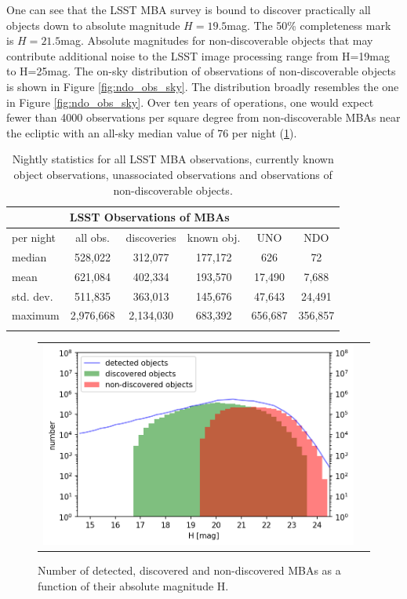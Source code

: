 One can see that the LSST MBA survey is bound to discover practically all objects down to absolute magnitude $H=19.5$mag. The 50\% completeness mark is $H=21.5$mag.
Absolute magnitudes for non-discoverable objects that may contribute additional noise to the LSST image processing range from H=19mag to H=25mag.
The on-sky distribution of observations of non-discoverable objects is shown in Figure \ref{fig:ndo_obs_sky}. The distribution broadly resembles the one in Figure \ref{fig:ndo_obs_sky}. Over ten years of operations, one would expect fewer than 4000 observations per square degree from non-discoverable MBAs near the ecliptic with an all-sky median value of 76 per night (\ref{tab:obs_stats}).   
%
\begin{table}[tb!]
\begin{center}
\begin{tabular}{lccccc}
\multicolumn{5}{c}{LSST Observations of MBAs}\\
\hline\hline
per night & all obs. & discoveries & known obj. & UNO & NDO \\\hline
median  & 528,022 &312,077  &177,172 &626 &72 \\
mean & 621,084 & 402,334 & 193,570 & 17,490 & 7,688 \\
std. dev. & 511,835 & 363,013& 145,676 &47,643 & 24,491\\
maximum & 2,976,668 & 2,134,030 & 683,392 & 656,687 & 356,857\\
\hline\hline\\
\end{tabular}
\end{center}
\caption{Nightly statistics for all LSST MBA observations, currently known object observations, unassociated observations and observations of
non-discoverable objects.}
\label{tab:obs_stats}
\end{table}
%

\begin{figure}[tb!]
\begin{center}
\begin{tabular}{cc}
\includegraphics[width=0.70\linewidth]{figs/detection_discovered2.png}
\end{tabular}
\end{center}
\caption{Number of detected, discovered and non-discovered MBAs as a function of their absolute magnitude H. }
\label{fig:ndo_h}       %
\end{figure}

